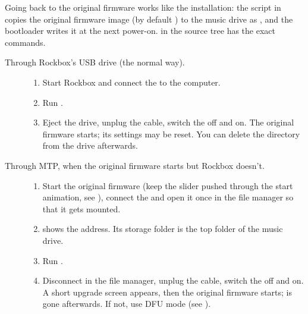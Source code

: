 \label{ref:yps3_uninstall}
Going back to the original firmware works like the installation: the
script  in  copies the original
firmware image (by default ) to the music drive as
, and the \playerman{} bootloader writes it at the next
power-on.  in the source tree has the exact commands.

\begin{description}
  \item[Through Rockbox's USB drive (the normal way).]\leavevmode
    \begin{enumerate}
      \item Start Rockbox and connect the \dap{} to the computer.
      \item Run .
      \item Eject the drive, unplug the cable, switch the \dap{} off and on.
        The original firmware starts; its settings may be reset. You can
        delete the  directory from the drive afterwards.
    \end{enumerate}
  \item[Through MTP, when the original firmware starts but Rockbox doesn't.]\leavevmode
    \begin{enumerate}
      \item Start the original firmware (keep the \ButtonPower{} slider pushed
        through the start animation, see ), connect
        the \dap{} and open it once in the file manager so that it gets
        mounted.
      \item {} shows the \daps{} 
        address. Its storage folder  is the top folder of the music drive.
      \item Run .
      \item Disconnect in the file manager, unplug the cable, switch the
        \dap{} off and on. A short upgrade screen appears, then the original
        firmware starts;  is gone afterwards. If not, use DFU
        mode (see ).
    \end{enumerate}
\end{description}
